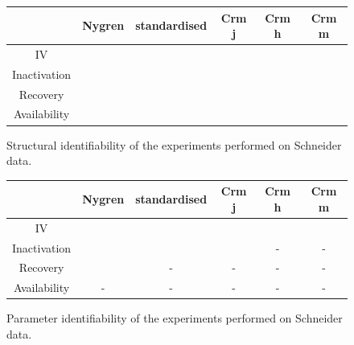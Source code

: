 \documentclass[11pt]{report}
\newcommand{\cmark}{ \color{green} \ding{51}}%
\newcommand{\xmark}{ \color{red} \ding{55}}%
\begin{document}
\begin{figure}[H]
\centering
\captionsetup{singlelinecheck = false, format= hang, justification=centerlast, labelsep=space}
\begin{measuredfigure}
\begin{tabular}{|c|c|c|c|c|c|}
\hline
& Nygren & standardised & Crm j & Crm h & Crm m\\
\hline
IV & \cmark   &  \cmark & \cmark & \cmark & \cmark  \\
\hline
Inactivation &  \cmark &  \cmark &  \cmark & \xmark &   \xmark \\
\hline
Recovery & \cmark &  \xmark & \xmark  & \xmark &  \xmark  \\
\hline
Availability & \xmark &  \xmark & \xmark & \xmark & \xmark  \\
\hline
\end{tabular}
\caption{Structural identifiability of the experiments performed on Schneider data.
 \cite{Schneider1994}}
\end{measuredfigure}
\addtocounter{figure}{-1}
\label{tab:StructuralIdentifiabilitySchneider}
\end{figure}



\begin{figure}[H]
\centering
\captionsetup{singlelinecheck = false, format= hang, justification=centerlast, labelsep=space}
\begin{measuredfigure}
\begin{tabular}{|c|c|c|c|c|c|}
\hline
& Nygren & standardised & Crm j & Crm h & Crm m\\
\hline
IV & \cmark   &  \cmark & \cmark & \cmark & \cmark  \\
\hline
Inactivation &  \cmark &  \cmark &  \cmark & - &   - \\
\hline
Recovery & \xmark &  - & -  & - &  -  \\
\hline
Availability & - &  - & - & - & -  \\
\hline
\end{tabular}
\caption{Parameter identifiability of the experiments performed on Schneider data. \cite{Schneider1994}}
\end{measuredfigure}
\addtocounter{figure}{-1}
\label{tab:ParameterIdentifiabilitySchneider}
\end{figure}
\end{document}
